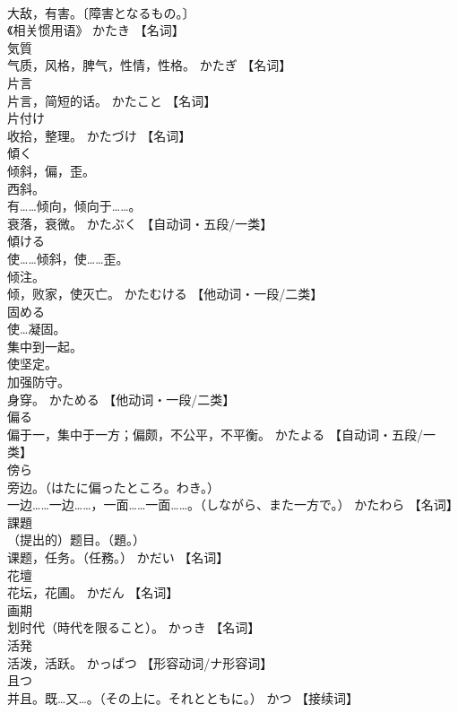 \documentclass[8pt]{extreport}
\begin{document}
\begin{CJK}{UTF8}{min}
\\	大敌，有害。〔障害となるもの。〕 
\\	《相关惯用语》	かたき		【名词】
\\	気質	
\\	气质，风格，脾气，性情，性格。	かたぎ		【名词】
\\	片言	
\\	片言，简短的话。	かたこと		【名词】
\\	片付け	
\\	收拾，整理。	かたづけ		【名词】
\\	傾く	
\\	倾斜，偏，歪。 
\\	西斜。 
\\	有……倾向，倾向于……。 
\\	衰落，衰微。	かたぶく		【自动词・五段/一类】
\\	傾ける	
\\	使……倾斜，使……歪。 
\\	倾注。 
\\	倾，败家，使灭亡。	かたむける		【他动词・一段/二类】
\\	固める	
\\	使…凝固。 
\\	集中到一起。 
\\	使坚定。 
\\	加强防守。 
\\	身穿。	かためる		【他动词・一段/二类】
\\	偏る	
\\	偏于一，集中于一方；偏颇，不公平，不平衡。	かたよる		【自动词・五段/一类】
\\	傍ら	
\\	旁边。（はたに偏ったところ。わき。） 
\\	一边……一边……，一面……一面……。（しながら、また一方で。）	かたわら		【名词】
\\	課題	
\\	（提出的）题目。（題。） 
\\	课题，任务。（任務。）	かだい		【名词】
\\	花壇	
\\	花坛，花圃。	かだん		【名词】
\\	画期	
\\	划时代（時代を限ること）。	かっき		【名词】
\\	活発	
\\	活泼，活跃。	かっぱつ		【形容动词/ナ形容词】
\\	且つ	
\\	并且。既…又…。（その上に。それとともに。）	かつ		【接续词】

\end{CJK}
\end{document}
